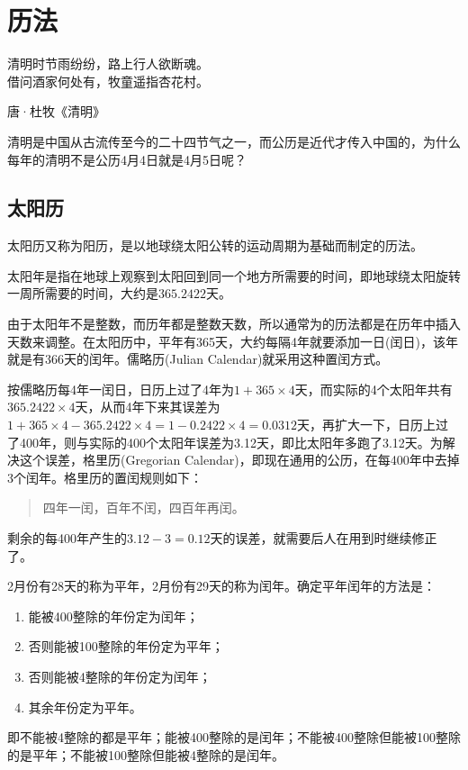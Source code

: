 
\chapter{历法}
\label{chap:calendar}

\epigraph{清明时节雨纷纷，路上行人欲断魂。\\借问酒家何处有，牧童遥指杏花村。}{唐·杜牧《清明》}

清明是中国从古流传至今的二十四节气之一，而公历是近代才传入中国的，为什么每年的清明不是公历4月4日就是4月5日呢？

\section{太阳历}
\label{sec:solar-calendars}

太阳历又称为阳历，是以地球绕太阳公转的运动周期为基础而制定的历法。

\begin{definition}
  太阳年是指在地球上观察到太阳回到同一个地方所需要的时间，即地球绕太阳旋转一周所需要的时间，大约是$365.2422$天。
\end{definition}

由于太阳年不是整数，而历年都是整数天数，所以通常为的历法都是在历年中插入天数来调整。在太阳历中，平年有365天，大约每隔4年就要添加一日(闰日)，该年就是有366天的闰年。儒略历(Julian Calendar)就采用这种置闰方式。

按儒略历每4年一闰日，日历上过了4年为$1+365\times4$天，而实际的4个太阳年共有$365.2422\times4$天，从而4年下来其误差为$1+365\times4-365.2422\times4=1-0.2422\times4=0.0312$天，再扩大一下，日历上过了400年，则与实际的400个太阳年误差为3.12天，即比太阳年多跑了3.12天。为解决这个误差，格里历(Gregorian Calendar)，即现在通用的公历，在每400年中去掉3个闰年。格里历的置闰规则如下：
\begin{quotation}
  四年一闰，百年不闰，四百年再闰。
\end{quotation}

剩余的每400年产生的$3.12-3=0.12$天的误差，就需要后人在用到时继续修正了。

\begin{definition}
  2月份有28天的称为平年，2月份有29天的称为闰年。确定平年闰年的方法是：
  \begin{enumerate}
  \item 能被400整除的年份定为闰年；
  \item 否则能被100整除的年份定为平年；
  \item 否则能被4整除的年份定为闰年；
  \item 其余年份定为平年。
  \end{enumerate}
  即不能被4整除的都是平年；能被400整除的是闰年；不能被400整除但能被100整除的是平年；不能被100整除但能被4整除的是闰年。
\end{definition}


